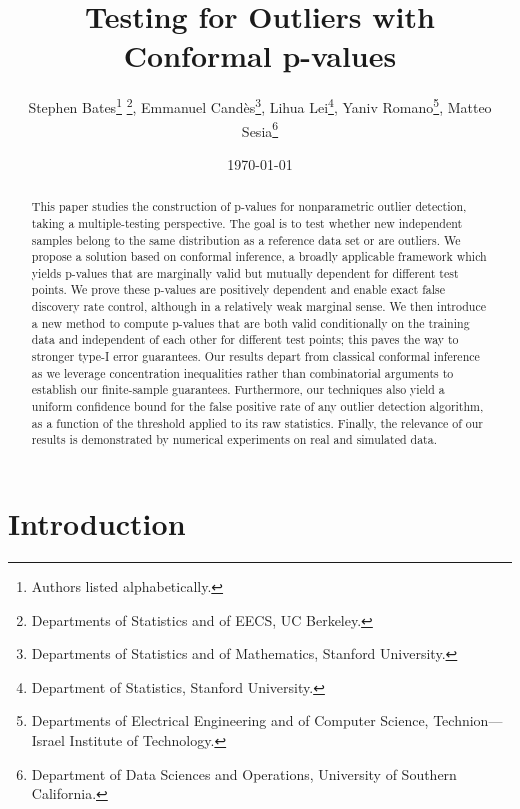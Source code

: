 \title{Testing for Outliers with Conformal p-values}
\author{Stephen Bates\footnote{Authors listed alphabetically.} \thanks{Departments of Statistics and of EECS, UC Berkeley.}, Emmanuel Cand{\`e}s\thanks{Departments of Statistics and of Mathematics, Stanford University.}, Lihua Lei\thanks{Department of Statistics, Stanford University.}, Yaniv Romano\thanks{Departments of Electrical Engineering and of Computer Science, Technion---Israel Institute of Technology.}, Matteo Sesia\thanks{Department of Data Sciences and Operations, University of Southern California.}}
\date{\today}


\maketitle

\begin{abstract}
This paper studies the construction of p-values for nonparametric outlier detection, taking a multiple-testing perspective. The goal is to test whether new independent samples belong to the same distribution as a reference data set or are outliers. We propose a solution based on conformal inference, a broadly applicable framework which yields p-values that are marginally valid but mutually dependent for different test points. We prove these p-values are positively dependent and enable exact false discovery rate control, although in a relatively weak marginal sense. We then introduce a new method to compute p-values that are both valid conditionally on the training data and independent of each other for different test points; this paves the way to stronger type-I error guarantees. Our results depart from classical conformal inference as we leverage concentration inequalities rather than combinatorial arguments to establish our finite-sample guarantees. Furthermore, our techniques also yield a uniform confidence bound for the false positive rate of any outlier detection algorithm, as a function of the threshold applied to its raw statistics. Finally, the relevance of our results is demonstrated by numerical experiments on real and simulated data.
\end{abstract}


\section{Introduction}

